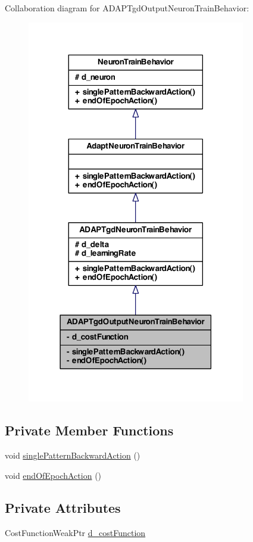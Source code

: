 Collaboration diagram for ADAPTgdOutputNeuronTrainBehavior:
\nopagebreak
\begin{figure}[H]
\begin{center}
\leavevmode
\includegraphics[width=270pt]{class_a_d_a_p_tgd_output_neuron_train_behavior__coll__graph}
\end{center}
\end{figure}
\subsection*{Private Member Functions}
\begin{DoxyCompactItemize}
\item 
void \hyperlink{class_a_d_a_p_tgd_output_neuron_train_behavior_ac729c67a60f0040fb98f4b174d81ee32}{singlePatternBackwardAction} ()
\item 
void \hyperlink{class_a_d_a_p_tgd_output_neuron_train_behavior_acd6199b7b17165e237da8c3dd51bf224}{endOfEpochAction} ()
\end{DoxyCompactItemize}
\subsection*{Private Attributes}
\begin{DoxyCompactItemize}
\item 
CostFunctionWeakPtr \hyperlink{class_a_d_a_p_tgd_output_neuron_train_behavior_a86ef51f3abe6661fb7b36b2f78e8c0f0}{d\_\-costFunction}
\end{DoxyCompactItemize}



